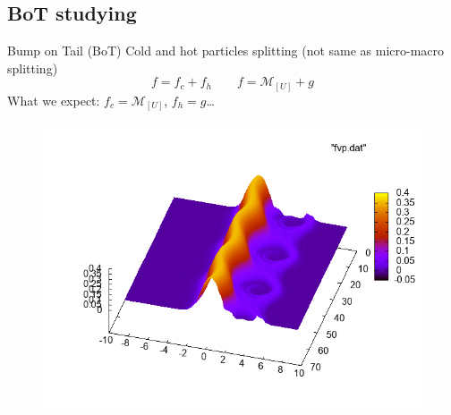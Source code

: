 \documentclass{beamer}
\begin{document}
  \subsection{BoT studying}
  \begin{frame}{Bump on Tail (BoT)}
  	Cold and hot particles splitting (not same as micro-macro splitting)
		$$
			f=f_c+f_h \qquad f=\mathcal{M}_{[U]}+g
		$$
		What we expect: $f_c = \mathcal{M}_{[U]}$, $f_h=g$\dots
  	\begin{figure}
        \centering
        \includegraphics[height=0.65\textheight]{img/fvp_bot.png}
      \end{figure}
  \end{frame}
\end{document}
